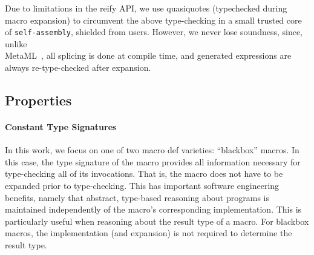 \documentclass[preprint,nocopyrightspace]{sigplanconf}
\newcommand{\sselfassembly}{\texttt{self-assembly}}
\begin{document}
Due to limitations in the reify API, we use quasiquotes (typechecked during
macro expansion) to circumvent the above type-checking in a small trusted core
of \sselfassembly, shielded from users. However, we never lose soundness,
since, unlike \\MetaML~\cite{MetaML}, all splicing is done at compile time, and
generated expressions are always re-type-checked after expansion.





\subsection{Properties}

\paragraph{Constant Type Signatures} In this work, we focus on one of two macro def
varieties: ``blackbox'' macros. In this case, the type signature of
the macro provides all information necessary for type-checking all of its
invocations. That is, the macro does not have to be expanded prior to type-checking.
This has important software engineering benefits, namely that
abstract, type-based reasoning about programs is maintained independently of
the macro's corresponding implementation. This is particularly useful when
reasoning about the result type of a macro. For blackbox macros, the
implementation (and expansion) is not required to determine the result
type.
\end{document}
